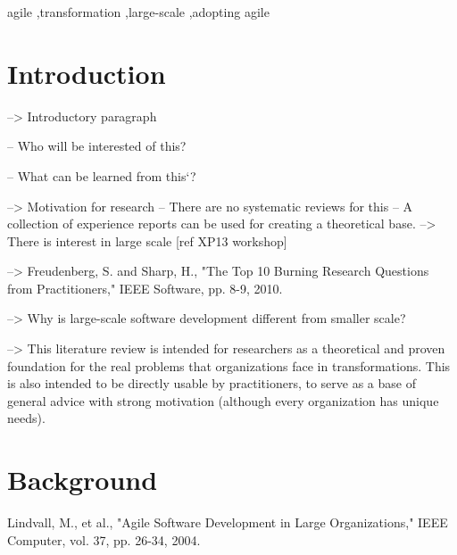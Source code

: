\documentclass[preprint,authoryear,12pt]{elsarticle}
\begin{document}
\begin{frontmatter}
\begin{abstract}
\end{abstract}

\begin{keyword}

agile \sep transformation \sep large-scale \sep adopting agile

\end{keyword}

\end{frontmatter}




\section{Introduction}

--> Introductory paragraph

-- Who will be interested of this?

-- What can be learned from this`?

--> Motivation for research
-- There are no systematic reviews for this
-- A collection of experience reports can be used for creating a theoretical
   base.
--> There is interest in large scale [ref XP13 workshop]

--> Freudenberg, S. and Sharp, H., "The Top 10 Burning Research Questions from
    Practitioners," IEEE Software, pp. 8-9, 2010.

--> Why is large-scale software development different from smaller scale?

--> This literature review is intended for researchers as a theoretical
   and proven foundation for the real problems that organizations face in
   transformations.
   This is also intended to be directly usable by practitioners, to serve as a
   base of general advice with strong motivation (although every organization
   has unique needs).


\section{Background}
\label{sec:background}

Lindvall, M., et al., "Agile Software Development in Large Organizations,"
IEEE Computer, vol. 37, pp. 26-34, 2004.
\end{document}
